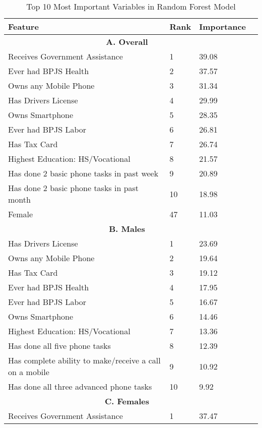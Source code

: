 \begin{table}[H] \begin{adjustbox}{max width=1.3\textwidth} \begin{threeparttable} \caption{Top 10 Most Important Variables in Random Forest Model} \label{varimpt} {\begin{tabular}{l*{1}{lll}} \toprule {Feature}&{Rank}&{Importance} \\ \midrule \multicolumn{3}{c}{\textbf{A. Overall}} \\
\hline
Receives Government Assistance&        1&    39.08\\
Ever had BPJS Health&        2&    37.57\\
Owns any Mobile Phone&        3&    31.34\\
Has Drivers License&        4&    29.99\\
Owns Smartphone &        5&    28.35\\
Ever had BPJS Labor&        6&    26.81\\
Has Tax Card    &        7&    26.74\\
Highest Education: HS/Vocational&        8&    21.57\\
Has done 2 basic phone tasks in past week&        9&    20.89\\
Has done 2 basic phone tasks in past month&       10&    18.98\\
Female          &       47&    11.03\\
\midrule \multicolumn{3}{c}{\textbf{B. Males}} \\ 
\hline
Has Drivers License&        1&    23.69\\
Owns any Mobile Phone&        2&    19.64\\
Has Tax Card    &        3&    19.12\\
Ever had BPJS Health&        4&    17.95\\
Ever had BPJS Labor&        5&    16.67\\
Owns Smartphone &        6&    14.46\\
Highest Education: HS/Vocational&        7&    13.36\\
Has done all five phone tasks&        8&    12.39\\
Has complete ability to make/receive a call on a mobile&        9&    10.92\\
Has done all three advanced phone tasks&       10&     9.92\\
\midrule \multicolumn{3}{c}{\textbf{C. Females}} \\  
\hline
Receives Government Assistance&        1&    37.47\\

\end{tabular}}
\end{threeparttable}
\end{adjustbox}
\end{table}

